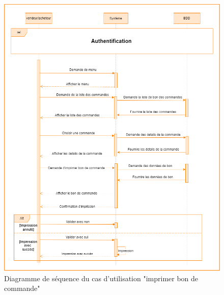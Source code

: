 \documentclass[edit,12pt,a4paper,ChapStyle,oneside,doubleinterligne]{report}
\begin{document}
\begin{figure}[h!]\label{fig:Diagramme cas1}
\centering
\includegraphics[width=1\textwidth]{images/seq imprimer bon de commande.png}
\caption{Diagramme de séquence du cas d'utilisation "imprimer bon de commande"}
\end{figure}

\clearpage
\end{document}
